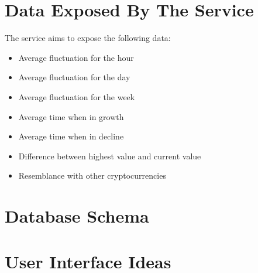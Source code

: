 \section{Data Exposed By The Service}
The service aims to expose the following data:
\begin{itemize}
    \item Average fluctuation for the hour
    \item Average fluctuation for the day
    \item Average fluctuation for the week
    \item Average time when in growth
    \item Average time when in decline
    \item Difference between highest value and current value
    \item Resemblance with other cryptocurrencies
\end{itemize}
\section{Database Schema}
\section{User Interface Ideas}